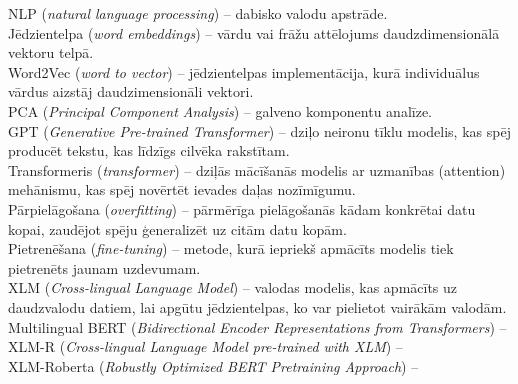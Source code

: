 NLP (\textit{natural language processing}) -- dabisko valodu apstrāde.\\
Jēdzientelpa (\textit{word embeddings}) -- vārdu vai frāžu attēlojums daudzdimensionālā vektoru telpā.\\
Word2Vec (\textit{word to vector}) -- jēdzientelpas implementācija, kurā individuālus vārdus aizstāj daudzimensionāli vektori.\\
PCA (\textit{Principal Component Analysis}) -- galveno komponentu analīze.\\
GPT (\textit{Generative Pre-trained Transformer}) – dziļo neironu tīklu modelis, kas spēj producēt tekstu, kas līdzīgs cilvēka rakstītam.\\
Transformeris (\textit{transformer}) -- dziļās mācīšanās modelis ar uzmanības (attention) mehānismu, kas spēj novērtēt ievades daļas nozīmīgumu.\\
Pārpielāgošana (\textit{overfitting}) -- pārmērīga pielāgošanās kādam konkrētai datu kopai, zaudējot spēju ģeneralizēt uz citām datu kopām.\\
Pietrenēšana (\textit{fine-tuning}) -- metode, kurā iepriekš apmācīts modelis tiek pietrenēts jaunam uzdevumam.\\
XLM (\textit{Cross-lingual Language Model}) -- valodas modelis, kas apmācīts uz daudzvalodu datiem, lai apgūtu jēdzientelpas, ko var pielietot vairākām valodām.\\
Multilingual BERT (\textit{Bidirectional Encoder Representations from Transformers}) --\\
XLM-R (\textit{Cross-lingual Language Model pre-trained with XLM}) --\\
XLM-Roberta (\textit{Robustly Optimized BERT Pretraining Approach}) -- \\
